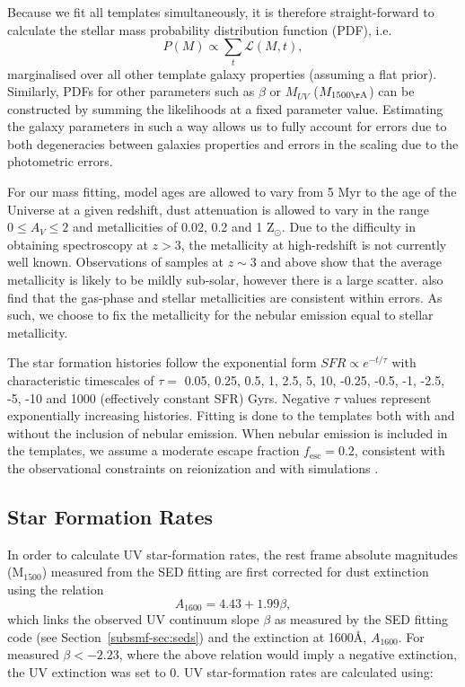Because we fit all templates simultaneously, it is therefore straight-forward to calculate the stellar mass probability distribution function (PDF), i.e. 
\begin{equation}
  P(M) \propto \sum_{t} \mathcal{L}(M,t),
\end{equation}
marginalised over all other template galaxy properties (assuming a flat prior). Similarly, PDFs for other parameters such as $\beta$ or $M_{UV}$ ($M_{1500\rm{\AA}}$) can be constructed by summing the likelihoods at a fixed parameter value. Estimating the galaxy parameters in such a way allows us to fully account for errors due to both degeneracies between galaxies properties and errors in the scaling due to the photometric errors.

For our mass fitting, model ages are allowed to vary from 5 Myr to the age of the Universe at a given redshift, dust attenuation is allowed to vary in the range $0 \le A_{V} \le 2$ and metallicities of 0.02, 0.2 and 1 Z$_{\odot}$. Due to the difficulty in obtaining spectroscopy at $z > 3$, the metallicity at high-redshift is not currently well known. Observations of samples at $z \sim 3$ and above \citep{Shapley:2003wi,2008ASPC..396..409M,2012A&A...539A.136S,Jones:2012kn} show that the average metallicity is likely to be mildly sub-solar, however there is a large scatter. \citet{2012A&A...539A.136S} also find that the gas-phase and stellar metallicities are consistent within errors. As such, we choose to fix the metallicity for the nebular emission equal to stellar metallicity.

The star formation histories follow the exponential form $SFR \propto e^{-t/\tau}$ with characteristic timescales of $\tau = $ 0.05, 0.25, 0.5, 1, 2.5, 5, 10, -0.25, -0.5, -1, -2.5, -5, -10 and 1000 (effectively constant SFR) Gyrs. Negative $\tau$ values represent exponentially increasing histories. Fitting is done to the templates both with and without the inclusion of nebular emission. When nebular emission is included in the templates, we assume a moderate escape fraction $f_{\text{esc}} = 0.2$, consistent with the observational constraints on reionization and with simulations \citep{Yajima:2010fb,Fernandez:2011cw,Finkelstein:2012hr,Robertson:2013ji}.

\subsection{Star Formation Rates}\label{smf-sec:SFR}
In order to calculate UV star-formation rates, the rest frame absolute magnitudes (M$_{1500}$) measured from the SED fitting are first corrected for dust extinction using the \citet{Meurer:1999jm} relation
\begin{equation}
A_{1600} = 4.43 + 1.99\beta,
\end{equation}
which links the observed UV continuum slope $\beta$ as measured by the SED fitting code (see Section~\ref{subsmf-sec:seds}) and the extinction at 1600\AA, $A_{1600}$. For measured $\beta < - 2.23$, where the above relation would imply a negative extinction, the UV extinction was set to 0. UV star-formation rates are calculated using: 

